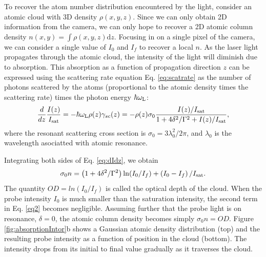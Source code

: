 To recover the atom number distribution encountered by the light, consider an atomic cloud with 3D density $\rho(x,y,z)$. Since we can only obtain 2D information from the camera, we can only hope to recover a 2D atomic column density $n(x,y)=\int\rho(x,y,z)\mathrm{d}z$. Focusing in on a single pixel of the camera, we can consider a single value of $I_0$ and $I_f$ to recover a local $n$. As the laser light propagates through the atomic cloud, the intensity of the light will diminish due to absorption. This absorption as a function of propagation direction $z$ can be expressed using the scattering rate equation Eq. \ref{eq:scatrate} as the number of photons scattered by the atoms (proportional to the atomic density times the scattering rate) times the photon energy $\hbar\omega_{\rm{L}}$:
\begin{equation}
\frac{d}{dz}\frac{I(z)}{I_{\rm{sat}}}=-\hbar\omega_{\rm{L}}\rho(z)\gamma_{sc}(z)=-\rho(z)\sigma_0\frac{I(z)/I_{\rm{sat}}}{1+4\delta^2 /\Gamma^2+I(z)/I_{\rm{sat}}},
\label{eq:dIdz}
\end{equation}
where the resonant scattering cross section is $\sigma_0=3\lambda_0^2/2\pi$, and $\lambda_0$ is the wavelength asociatted with atomic resonance. 

Integrating both sides of Eq. \ref{eq:dIdz}, we obtain
\begin{equation}
\sigma_0 n = \left(1+4\delta^2/\Gamma^2\right)\mathrm{ln}(I_0/I_f)+ \left(I_0-I_f\right)/I_{\rm{sat}}.
\label{eq2}
\end{equation}
The quantity $OD=ln(I_0/I_f)$ is called the optical depth of the cloud. When the probe intensity $I_0$ is much smaller than the saturation intensity, the second term in Eq. \ref{eq2} becomes negligible. Assuming further that the probe light is on resonance, $\delta=0$, the atomic column density becomes simply $\sigma_0 n=OD$. Figure \ref{fig:absorptionIntor}b shows a Gaussian atomic density distribution (top) and the resulting probe intensity as a function of position in the cloud (bottom). The intensity drops from its initial to final value gradually as it traverses the cloud.

